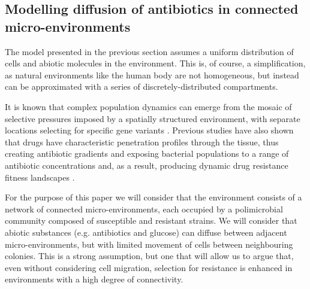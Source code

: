 \documentclass[fleqn,12pt]{wlscirep}
\begin{document}
\subsection*{Modelling diffusion of antibiotics in connected micro-environments}

The model presented in the previous section assumes a uniform distribution of cells and abiotic molecules in the environment. This is, of course, a simplification, as natural environments like the human body are not homogeneous, but instead can be approximated with a series of discretely-distributed compartments\cite{Kepler1998}. 

It is known that  complex population dynamics can emerge from the mosaic of selective pressures imposed by a spatially structured environment, with separate locations selecting for specific gene variants \cite{Baquero1997}. Previous studies have also shown that drugs have characteristic penetration profiles through the tissue, thus creating antibiotic gradients and exposing bacterial populations to a range of antibiotic concentrations\cite{Moreno2015} and, as a result, producing dynamic drug resistance fitness landscapes \cite{Mira2015,Engelstadter2014}.

For the purpose of this paper we will consider that the environment consists of a network of connected micro-environments, each occupied by a polimicrobial community composed of susceptible and resistant strains. We will consider that abiotic substances (e.g. antibiotics and glucose) can diffuse between adjacent micro-environments, but with limited movement of cells between neighbouring colonies.  This is a strong assumption, but one that will allow us to argue that, even without considering cell migration, selection for resistance is enhanced in environments with a high degree of connectivity.
\end{document}
